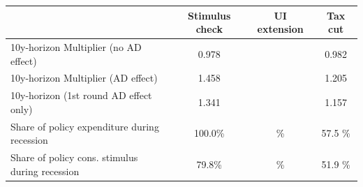 \begin{tabular}{@{}lccc@{}} 
\toprule 
& Stimulus check    & UI extension    & Tax cut     \\  \midrule 
10y-horizon Multiplier (no AD effect) &0.978  &   & 0.982     \\ 
10y-horizon Multiplier (AD effect) &1.458  &   & 1.205     \\ 
10y-horizon (1st round AD effect only) &1.341  &   & 1.157     \\ 
Share of policy expenditure during recession &100.0\%  & \%  & 57.5 \%    \\ 
Share of policy cons. stimulus during recession &79.8\%  & \%  & 51.9 \%    \\ \bottomrule 
\end{tabular}  
